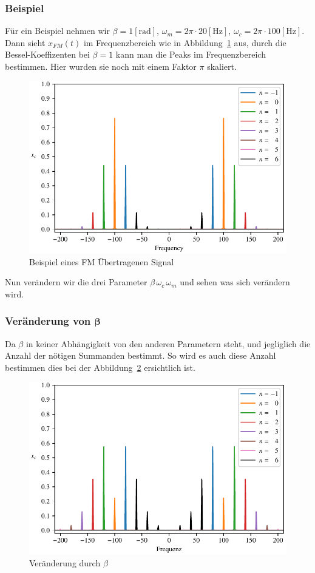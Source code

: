 \subsubsection{Beispiel}
Für ein Beispiel nehmen wir
\(\beta = 1 [\text{rad}]\), \(\omega_m = 2 \pi \cdot 20 [\text{Hz}]\),
\(\omega_c =  2 \pi \cdot 100 [\text{Hz}] \).
Dann sieht \(x_{FM}(t)\) im Frequenzbereich wie in
Abbildung~\ref{fig:fm:bessel_fm} aus, durch die Bessel-Koeffizenten bei
\(\beta = 1\) kann man die Peaks im Frequenzbereich bestimmen.
Hier wurden sie noch mit einem Faktor \(\pi\) skaliert.
\begin{figure}
\centering
\includegraphics{papers/fm/images/normal.pdf}
\caption{Beispiel eines FM Übertragenen Signal}
\label{fig:fm:bessel_fm}
\end{figure}
Nun verändern wir die drei Parameter \(\beta \,\omega_c \,\omega_m \)
und sehen was sich verändern wird.

\subsubsection{Veränderung von $\bm{\beta}$}
Da \(\beta\) in keiner Abhängigkeit von den anderen Parametern steht,
und jegliglich die Anzahl der nötigen Summanden bestimmt.
So wird es auch diese Anzahl bestimmen dies bei der
Abbildung~\ref{fig:fm:beta_fm} ersichtlich ist.
\begin{figure}[h]
	\centering
	\includegraphics{papers/fm/images/beta2.pdf}
	\caption{Veränderung durch \(\beta\)}
	\label{fig:fm:beta_fm}
\end{figure}

